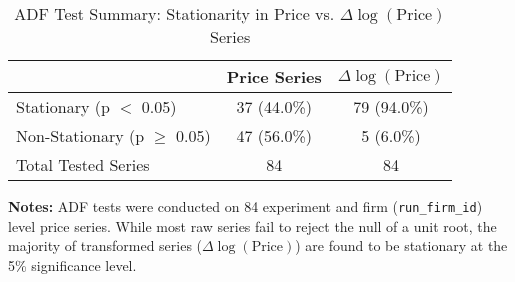 \begin{table}[H]
    \centering
    \caption{ADF Test Summary: Stationarity in Price vs. $\Delta \log(\text{Price})$ Series}
    \label{tab:adf_comparison}
    \begin{threeparttable}
    \begin{tabular}{lcc}
    \toprule
    & Price Series & $\Delta \log(\text{Price})$ \\
    \midrule
    Stationary (p $<$ 0.05)     & 37 (44.0\%)  & 79 (94.0\%) \\
    Non-Stationary (p $\geq$ 0.05) & 47 (56.0\%)  & 5 (6.0\%) \\
    \midrule
    Total Tested Series         & 84           & 84 \\
    \bottomrule
    \end{tabular}
    \begin{tablenotes}[flushleft]
    \footnotesize
    \item \textbf{Notes:} ADF tests were conducted on 84  experiment and firm (\texttt{run\_firm\_id}) level price series. While most raw series fail to reject the null of a unit root, the majority of transformed series ($\Delta \log(\text{Price})$) are found to be stationary at the 5\% significance level.
    \end{tablenotes}
    \end{threeparttable}
\end{table}




